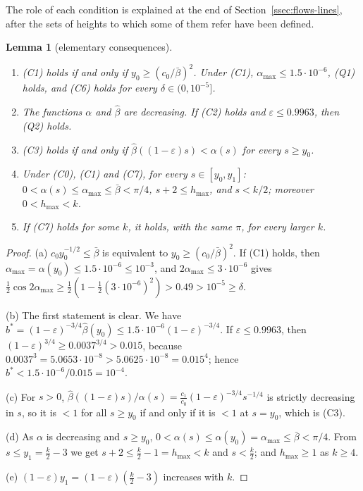 \documentclass[11pt]{amsart}
\newcommand{\amax}{\alpha_{\max}}
\newcommand{\hmax}{h_{\max}}
\newtheorem{lemma}[theorem]{Lemma}
\theoremstyle{definition}
\theoremstyle{remark}
\numberwithin{equation}{section}
\begin{document}
The role of each condition is explained at the end of Section~\ref{ssec:flows-lines}, after the sets of heights to which
some of them refer have been defined.

\begin{lemma}[elementary consequences]\label{lem:flows-constraints}
\begin{enumerate}[label=(\alph*)]
\item \textup{(C1)} holds if and only if $y_0\ge(c_0/\bar\beta)^2$. Under \textup{(C1)}, $\amax\le1.5\cdot10^{-6}$,
\textup{(Q1)} holds, and \textup{(C6)} holds for every $\delta\in(0,10^{-5}]$.
\item The functions $\alpha$ and $\hat\beta$ are decreasing. If \textup{(C2)} holds and $\varepsilon\le0.9963$, then
\textup{(Q2)} holds.
\item \textup{(C3)} holds if and only if $\hat\beta((1-\varepsilon)s)<\alpha(s)$ for every $s\ge y_0$.
\item Under \textup{(C0)}, \textup{(C1)} and \textup{(C7)}, for every $s\in[y_0,y_1]$:
$0<\alpha(s)\le\amax\le\bar\beta<\pi/4$, $s+2\le\hmax$, and $s<k/2$; moreover $0<\hmax<k$.
\item If \textup{(C7)} holds for some $k$, it holds, with the same $\pi$, for every larger $k$.
\end{enumerate}
\end{lemma}

\begin{proof}
(a) $c_0y_0^{-1/2}\le\bar\beta$ is equivalent to $y_0\ge(c_0/\bar\beta)^2$. If (C1) holds, then
$\amax=\alpha(y_0)\le1.5\cdot10^{-6}\le10^{-3}$, and $2\amax\le3\cdot10^{-6}$ gives
$\frac12\cos2\amax\ge\frac12(1-\frac12(3\cdot10^{-6})^2)>0.49>10^{-5}\ge\delta$.

(b) The first statement is clear. We have $b^*=(1-\varepsilon)^{-3/4}\hat\beta(y_0)\le1.5\cdot10^{-6}(1-\varepsilon)^{-3/4}$.
If $\varepsilon\le0.9963$, then $(1-\varepsilon)^{3/4}\ge0.0037^{3/4}>0.015$, because
$0.0037^3=5.0653\cdot10^{-8}>5.0625\cdot10^{-8}=0.015^4$; hence $b^*<1.5\cdot10^{-6}/0.015=10^{-4}$.

(c) For $s>0$, $\hat\beta((1-\varepsilon)s)/\alpha(s)=\frac{c_1}{c_0}(1-\varepsilon)^{-3/4}s^{-1/4}$ is strictly decreasing
in $s$, so it is $<1$ for all $s\ge y_0$ if and only if it is $<1$ at $s=y_0$, which is (C3).

(d) As $\alpha$ is decreasing and $s\ge y_0$, $0<\alpha(s)\le\alpha(y_0)=\amax\le\bar\beta<\pi/4$. From $s\le y_1=\frac k2-3$
we get $s+2\le\frac k2-1=\hmax<k$ and $s<\frac k2$; and $\hmax\ge1$ as $k\ge4$.

(e) $(1-\varepsilon)y_1=(1-\varepsilon)(\frac k2-3)$ increases with $k$.
\end{proof}
\end{document}
